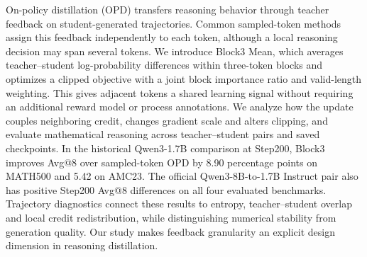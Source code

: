 On-policy distillation (OPD) transfers reasoning behavior through teacher feedback on student-generated trajectories. Common sampled-token methods assign this feedback independently to each token, although a local reasoning decision may span several tokens. We introduce Block3 Mean, which averages teacher--student log-probability differences within three-token blocks and optimizes a clipped objective with a joint block importance ratio and valid-length weighting. This gives adjacent tokens a shared learning signal without requiring an additional reward model or process annotations. We analyze how the update couples neighboring credit, changes gradient scale and alters clipping, and evaluate mathematical reasoning across teacher--student pairs and saved checkpoints. In the historical Qwen3-1.7B comparison at Step200, Block3 improves Avg@8 over sampled-token OPD by 8.90 percentage points on MATH500 and 5.42 on AMC23. The official Qwen3-8B-to-1.7B Instruct pair also has positive Step200 Avg@8 differences on all four evaluated benchmarks. Trajectory diagnostics connect these results to entropy, teacher--student overlap and local credit redistribution, while distinguishing numerical stability from generation quality. Our study makes feedback granularity an explicit design dimension in reasoning distillation.
